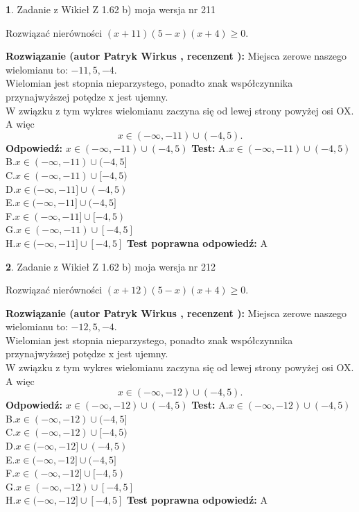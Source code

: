 \documentclass[12pt, a4paper]{article}
\theoremstyle{definition} %
\newtheorem{zad}{}
\newcommand{\zadStart}[1]{\begin{zad}#1\newline}
\newcommand{\zadStop}{\end{zad}}
\newcommand{\rozwStart}[2]{\noindent \textbf{Rozwiązanie (autor #1 , recenzent #2): }\newline}
\newcommand{\rozwStop}{\newline}
\newcommand{\odpStart}{\noindent \textbf{Odpowiedź:}\newline}
\newcommand{\odpStop}{\newline}
\newcommand{\testStart}{\noindent \textbf{Test:}\newline}
\newcommand{\testStop}{\newline}
\newcommand{\kluczStart}{\noindent \textbf{Test poprawna odpowiedź:}\newline}
\newcommand{\kluczStop}{\newline}
\begin{document}
\zadStart{Zadanie z Wikieł Z 1.62 b) moja wersja nr 211}

Rozwiązać nierówności $(x+11)(5-x)(x+4)\ge0$.
\zadStop
\rozwStart{Patryk Wirkus}{}
Miejsca zerowe naszego wielomianu to: $-11, 5, -4$.\\
Wielomian jest stopnia nieparzystego, ponadto znak współczynnika przy\linebreak najwyższej potędze x jest ujemny.\\ W związku z tym wykres wielomianu zaczyna się od lewej strony powyżej osi OX. A więc $$x \in (-\infty,-11) \cup (-4,5).$$
\rozwStop
\odpStart
$x \in (-\infty,-11) \cup (-4,5)$
\odpStop
\testStart
A.$x \in (-\infty,-11) \cup (-4,5)$\\
B.$x \in (-\infty,-11) \cup (-4,5]$\\
C.$x \in (-\infty,-11) \cup [-4,5)$\\
D.$x \in (-\infty,-11] \cup (-4,5)$\\
E.$x \in (-\infty,-11] \cup (-4,5]$\\
F.$x \in (-\infty,-11] \cup [-4,5)$\\
G.$x \in (-\infty,-11) \cup [-4,5]$\\
H.$x \in (-\infty,-11] \cup [-4,5]$
\testStop
\kluczStart
A
\kluczStop



\zadStart{Zadanie z Wikieł Z 1.62 b) moja wersja nr 212}

Rozwiązać nierówności $(x+12)(5-x)(x+4)\ge0$.
\zadStop
\rozwStart{Patryk Wirkus}{}
Miejsca zerowe naszego wielomianu to: $-12, 5, -4$.\\
Wielomian jest stopnia nieparzystego, ponadto znak współczynnika przy\linebreak najwyższej potędze x jest ujemny.\\ W związku z tym wykres wielomianu zaczyna się od lewej strony powyżej osi OX. A więc $$x \in (-\infty,-12) \cup (-4,5).$$
\rozwStop
\odpStart
$x \in (-\infty,-12) \cup (-4,5)$
\odpStop
\testStart
A.$x \in (-\infty,-12) \cup (-4,5)$\\
B.$x \in (-\infty,-12) \cup (-4,5]$\\
C.$x \in (-\infty,-12) \cup [-4,5)$\\
D.$x \in (-\infty,-12] \cup (-4,5)$\\
E.$x \in (-\infty,-12] \cup (-4,5]$\\
F.$x \in (-\infty,-12] \cup [-4,5)$\\
G.$x \in (-\infty,-12) \cup [-4,5]$\\
H.$x \in (-\infty,-12] \cup [-4,5]$
\testStop
\kluczStart
A
\kluczStop
\end{document}
